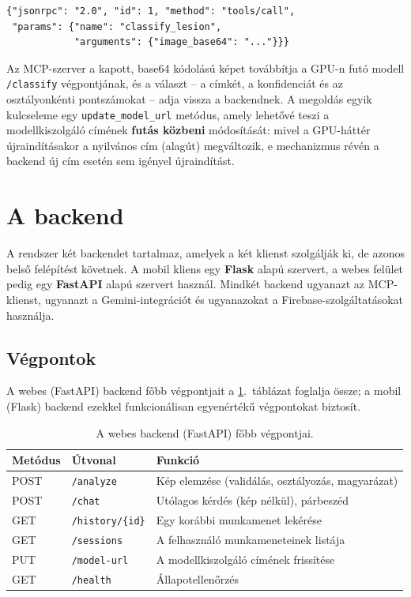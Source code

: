 \begin{verbatim}
{"jsonrpc": "2.0", "id": 1, "method": "tools/call",
 "params": {"name": "classify_lesion",
            "arguments": {"image_base64": "..."}}}
\end{verbatim}

Az MCP-szerver a kapott, base64 kódolású képet továbbítja a GPU-n futó modell
\texttt{/classify} végpontjának, és a választ -- a címkét, a konfidenciát és az
osztályonkénti pontszámokat -- adja vissza a backendnek. A megoldás egyik
kulcseleme egy \texttt{update\_model\_url} metódus, amely lehetővé teszi a
modellkiszolgáló címének \textbf{futás közbeni} módosítását: mivel a GPU-háttér
újraindításakor a nyilvános cím (alagút) megváltozik, e mechanizmus révén a
backend új cím esetén sem igényel újraindítást.

\section{A backend}

A rendszer két backendet tartalmaz, amelyek a két klienst szolgálják ki, de
azonos belső felépítést követnek. A mobil kliens egy \textbf{Flask}
\cite{flask} alapú szervert, a webes felület pedig egy \textbf{FastAPI}
\cite{fastapi} alapú szervert használ. Mindkét backend ugyanazt az MCP-klienst,
ugyanazt a Gemini-integrációt és ugyanazokat a Firebase-szolgáltatásokat
használja.

\subsection{Végpontok}

A webes (FastAPI) backend főbb végpontjait a \ref{tab:endpoints}.~táblázat
foglalja össze; a mobil (Flask) backend ezekkel funkcionálisan egyenértékű
végpontokat biztosít.

\begin{table}[H]
  \centering
  \caption{A webes backend (FastAPI) főbb végpontjai.}
  \label{tab:endpoints}
  \begin{tabular}{lll}
    \hline
    \textbf{Metódus} & \textbf{Útvonal} & \textbf{Funkció} \\
    \hline
    POST & \texttt{/analyze}            & Kép elemzése (validálás, osztályozás, magyarázat) \\
    POST & \texttt{/chat}               & Utólagos kérdés (kép nélkül), párbeszéd \\
    GET  & \texttt{/history/\{id\}}     & Egy korábbi munkamenet lekérése \\
    GET  & \texttt{/sessions}           & A felhasználó munkameneteinek listája \\
    PUT  & \texttt{/model-url}          & A modellkiszolgáló címének frissítése \\
    GET  & \texttt{/health}             & Állapotellenőrzés \\
    \hline
  \end{tabular}
\end{table}

